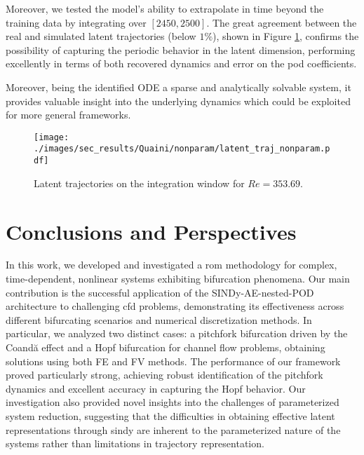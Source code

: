 \documentclass[reqno]{amsart}[standalone]
\theoremstyle{definition}
\theoremstyle{remark}
\begin{document}
Moreover, we tested the model's ability to extrapolate in time beyond the training data by integrating over $[2450, 2500]$.
%
The great agreement between the real and simulated latent trajectories (below $1\%$), shown in Figure \ref{figQUAINI_LATENT_SINGLE}, confirms the possibility of capturing the periodic behavior in the latent dimension, performing excellently in terms of both recovered dynamics and error on the \gls{pod} coefficients.

Moreover, being the identified ODE a sparse and analytically solvable system, it provides valuable insight into the underlying dynamics which could be exploited for more general frameworks.

\begin{figure}[htbp]
    \centering
\texttt{[image: ./images/sec\_results/Quaini/nonparam/latent\_traj\_nonparam.pdf]}
    \caption{Latent trajectories on the integration window for $Re=353.69$.}
    \label{figQUAINI_LATENT_SINGLE}
\end{figure}

\section{Conclusions and Perspectives}\label{sec:conclusions_and_perspectives}
In this work, we developed and investigated a \gls{rom} methodology for complex, time-dependent, nonlinear systems exhibiting bifurcation phenomena. Our main contribution is the successful application of the SINDy-AE-nested-POD architecture to challenging \gls{cfd} problems, demonstrating its effectiveness across different bifurcating scenarios and numerical discretization methods. In particular, we analyzed two distinct cases: a pitchfork bifurcation driven by the Coandă effect and a Hopf bifurcation for  channel flow problems, obtaining solutions using both FE and FV methods. The performance of our framework proved particularly strong, achieving robust identification of the pitchfork dynamics and excellent accuracy in capturing the Hopf behavior. Our investigation also provided novel insights into the challenges of parameterized system reduction, suggesting that the difficulties in obtaining effective latent representations through \gls{sindy} are inherent to the parameterized nature of the systems rather than limitations in trajectory representation.
%
%
%
\end{document}

